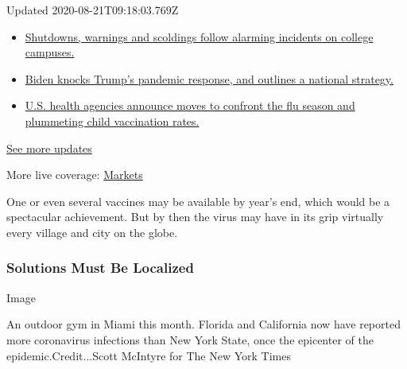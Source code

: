 Updated 2020-08-21T09:18:03.769Z

\begin{itemize}
\tightlist
\item
  \href{https://www.nytimes3xbfgragh.onion/2020/08/20/world/coronavirus-covid.html?action=click\&pgtype=Article\&state=default\&region=MAIN_CONTENT_1\&context=storylines_live_updates\#link-68774d88}{Shutdowns,
  warnings and scoldings follow alarming incidents on college campuses.}
\item
  \href{https://www.nytimes3xbfgragh.onion/2020/08/20/world/coronavirus-covid.html?action=click\&pgtype=Article\&state=default\&region=MAIN_CONTENT_1\&context=storylines_live_updates\#link-26b58724}{Biden
  knocks Trump's pandemic response, and outlines a national strategy.}
\item
  \href{https://www.nytimes3xbfgragh.onion/2020/08/20/world/coronavirus-covid.html?action=click\&pgtype=Article\&state=default\&region=MAIN_CONTENT_1\&context=storylines_live_updates\#link-4e542da3}{U.S.
  health agencies announce moves to confront the flu season and
  plummeting child vaccination rates.}
\end{itemize}

\href{https://www.nytimes3xbfgragh.onion/2020/08/20/world/coronavirus-covid.html?action=click\&pgtype=Article\&state=default\&region=MAIN_CONTENT_1\&context=storylines_live_updates}{See
more updates}

More live coverage:
\href{https://www.nytimes3xbfgragh.onion/live/2020/08/20/business/stock-market-today-coronavirus?action=click\&pgtype=Article\&state=default\&region=MAIN_CONTENT_1\&context=storylines_live_updates}{Markets}

One or even several vaccines may be available by year's end, which would
be a spectacular achievement. But by then the virus may have in its grip
virtually every village and city on the globe.

\hypertarget{solutions-must-be-localized}{%
\subsubsection{Solutions Must Be
Localized}\label{solutions-must-be-localized}}

Image

An outdoor gym in Miami this month. Florida and California now have
reported more coronavirus infections than New York State, once the
epicenter of the epidemic.Credit...Scott McIntyre for The New York Times

